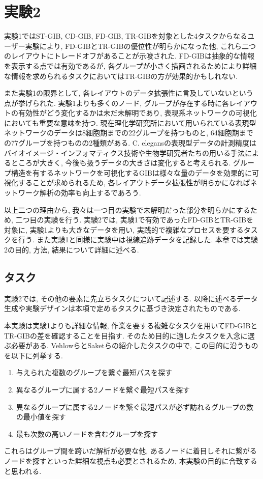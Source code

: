 \documentclass{kuee}
\begin{document}
\chapter{実験2}
\label{chap:ex_2}

実験1ではST-GIB, CD-GIB, FD-GIB, TR-GIBを対象とした4タスクからなるユーザー実験により, FD-GIBとTR-GIBの優位性が明らかになった他, これら二つのレイアウトにトレードオフがあることが示唆された.
FD-GIBは抽象的な情報を表示する点では有効であるが, 各グループが小さく描画されるためにより詳細な情報を求められるタスクにおいてはTR-GIBの方が効果的かもしれない.

また実験1の限界として, 各レイアウトのデータ拡張性に言及していないという点が挙げられた.
実験1よりも多くのノード, グループが存在する時に各レイアウトの有効性がどう変化するかは未だ未解明であり, 表現系ネットワークの可視化においても重要な意味を持つ.
現在理化学研究所において用いられている表現型ネットワークのデータは8細胞期までの22グループを持つものと, 64細胞期までの77グループを持つものの2種類がある.
C. elegansの表現型データの計測精度はバイオイメージ・インフォマティクス技術や生物学研究者たちの用いる手法によるところが大きく, 今後も扱うデータの大きさは変化すると考えられる.
グループ構造を有するネットワークを可視化するGIBは様々な量のデータを効果的に可視化することが求められるため, 各レイアウトデータ拡張性が明らかになればネットワーク解析の効率も向上するであろう.

以上二つの理由から, 我々は一つ目の実験で未解明だった部分を明らかにするため, 二つ目の実験を行う.
実験2では, 実験1で有効であったFD-GIBとTR-GIBを対象に, 実験1よりも大きなデータを用い, 実践的で複雑なプロセスを要するタスクを行う.
また実験1と同様に実験中は視線追跡データを記録した.
本章では実験2の目的, 方法, 結果について詳細に述べる.

\section{タスク}
\label{sec:task-ex2}

実験2では, その他の要素に先立ちタスクについて記述する.
以降に述べるデータ生成や実験デザインは本項で定めるタスクに基づき決定されたものである.

本実験は実験1よりも詳細な情報, 作業を要する複雑なタスクを用いてFD-GIBとTR-GIBの差を確認することを目指す.
そのため目的に適したタスクを入念に選ぶ必要がある.
Vehlowら\cite{Vehlow2017VisualizingGS}とSaketら\cite{saket2014group}の紹介したタスクの中で, この目的に沿うものを以下に列挙する.
\begin{enumerate}
  \item 与えられた複数のグループを繋ぐ最短パスを探す
  \item 異なるグループに属する2ノードを繋ぐ最短パスを探す
  \item 異なるグループに属する2ノードを繋ぐ最短パスが必ず訪れるグループの数の最小値を探す
  \item 最も次数の高いノードを含むグループを探す
\end{enumerate}
これらはグループ間を跨いだ解析が必要な他, あるノードに着目しそれに繋がるノードを探すといった詳細な視点も必要とされるため, 本実験の目的に合致すると思われる.
\end{document}
